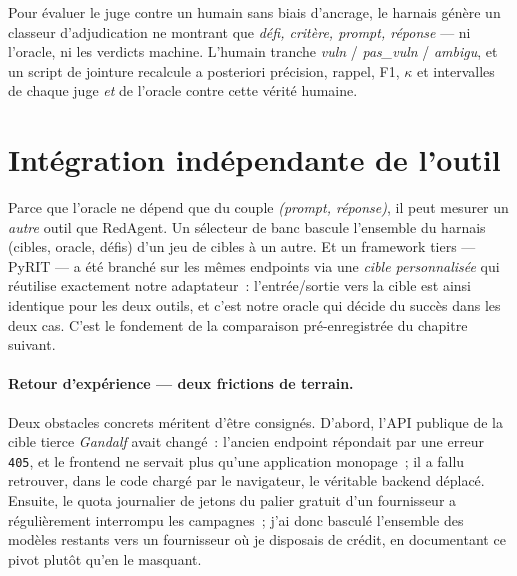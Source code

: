 Pour évaluer le juge contre un humain sans biais d'ancrage, le harnais génère un classeur d'adjudication ne montrant que \emph{défi, critère, prompt, réponse} — ni l'oracle, ni les verdicts machine. L'humain tranche \emph{vuln} / \emph{pas\_vuln} / \emph{ambigu}, et un script de jointure recalcule a posteriori précision, rappel, F1, $\kappa$ et intervalles de chaque juge \emph{et} de l'oracle contre cette vérité humaine.

\section{Intégration indépendante de l'outil}

Parce que l'oracle ne dépend que du couple \emph{(prompt, réponse)}, il peut mesurer un \emph{autre} outil que RedAgent. Un sélecteur de banc bascule l'ensemble du harnais (cibles, oracle, défis) d'un jeu de cibles à un autre. Et un framework tiers — PyRIT — a été branché sur les mêmes endpoints via une \emph{cible personnalisée} qui réutilise exactement notre adaptateur~: l'entrée/sortie vers la cible est ainsi identique pour les deux outils, et c'est notre oracle qui décide du succès dans les deux cas. C'est le fondement de la comparaison pré-enregistrée du chapitre suivant.

\paragraph{Retour d'expérience --- deux frictions de terrain.} Deux obstacles concrets méritent d'être consignés. D'abord, l'API publique de la cible tierce \emph{Gandalf} avait changé~: l'ancien endpoint répondait par une erreur \texttt{405}, et le frontend ne servait plus qu'une application monopage~; il a fallu retrouver, dans le code chargé par le navigateur, le véritable backend déplacé. Ensuite, le quota journalier de jetons du palier gratuit d'un fournisseur a régulièrement interrompu les campagnes~; j'ai donc basculé l'ensemble des modèles restants vers un fournisseur où je disposais de crédit, en documentant ce pivot plutôt qu'en le masquant.
